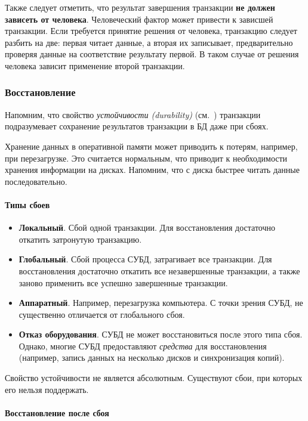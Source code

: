 Также следует отметить, что результат завершения транзакции \textbf{не должен зависеть от человека}. Человеческий
фактор может привести к зависшей транзакции. Если требуется принятие решения от человека,
транзакцию следует разбить на две: первая читает данные, а вторая их записывает, предварительно
проверяя данные на соответствие результату первой. В таком случае от решения человека зависит
применение второй транзакции.

\subsubsection{Восстановление}

Напомним, что свойство \textit{устойчивости (durability)} (см.~) транзакции подразумевает сохранение результатов
транзакции в БД даже при сбоях.

Хранение данных в оперативной памяти может приводить к потерям, например, при перезагрузке. Это
считается нормальным, что приводит к необходимости хранения информации на дисках. Напомним, что с
диска быстрее читать данные последовательно.

\paragraph{Типы сбоев}

\begin{itemize}
	\item \textbf{Локальный}. Сбой одной транзакции. Для восстановления
	      достаточно откатить затронутую транзакцию.
	\item \textbf{Глобальный}. Сбой процесса СУБД, затрагивает все транзакции.
	      Для восстановления достаточно откатить все незавершенные транзакции, а также заново применить все
	      успешно завершенные транзакции.
	\item \textbf{Аппаратный}. Например, перезагрузка компьютера. С точки
	      зрения СУБД, не существенно отличается от глобального сбоя.
	\item \textbf{Отказ оборудования}. СУБД не может восстановиться после этого
	      типа сбоя. Однако, многие СУБД предоставляют \textit{средства} для восстановления (например,
	      запись данных на несколько дисков и синхронизация копий).
\end{itemize}

Свойство устойчивости не является абсолютным. Существуют сбои, при которых его нельзя поддержать.

\paragraph{Восстановление после сбоя}

